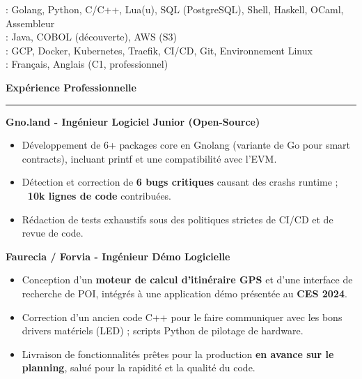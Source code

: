 \documentclass[9pt]{extarticle}
\begin{document}
\hspace*{5pt}{\bfseries Maîtrise}: Golang, Python, C/C++, Lua(u), SQL (PostgreSQL), Shell, Haskell, OCaml, Assembleur
\\
\hspace*{5pt}{\bfseries Notions}: Java, COBOL (découverte), AWS (S3)
\\
\hspace*{5pt}{\bfseries Cloud \& DevOps}: GCP, Docker, Kubernetes, Traefik, CI/CD, Git, Environnement Linux
\\
\hspace*{5pt}{\bfseries Langues}: Français, Anglais (C1, professionnel)

\par\vspace{5pt}


{\large\bfseries Expérience Professionnelle}
\par\vspace{-8pt}
\rule{\linewidth}{0.4pt}
\par\vspace{5pt}

{\bfseries Gno.land - Ingénieur Logiciel Junior (Open-Source)}
\begin{itemize}[noitemsep, topsep=0pt]
	\item Développement de 6+ packages core en Gnolang (variante de Go pour smart contracts), incluant printf et une compatibilité avec l'EVM.
	\item Détection et correction de {\bfseries 6 bugs critiques} causant des crashs runtime ; {\bfseries ~10k lignes de code} contribuées.
	\item Rédaction de tests exhaustifs sous des politiques strictes de CI/CD et de revue de code.
\end{itemize}

\par\vspace{5pt}

{\bfseries Faurecia / Forvia - Ingénieur Démo Logicielle}
\begin{itemize}[noitemsep, topsep=0pt]
	\item Conception d'un {\bfseries moteur de calcul d'itinéraire GPS} et d'une interface de recherche de POI, intégrés à une application démo présentée au {\bfseries CES 2024}.
	\item Correction d'un ancien code C++ pour le faire communiquer avec les bons drivers matériels (LED) ; scripts Python de pilotage de hardware.
	\item Livraison de fonctionnalités prêtes pour la production {\bfseries en avance sur le planning}, salué pour la rapidité et la qualité du code.
\end{itemize}
\end{document}
